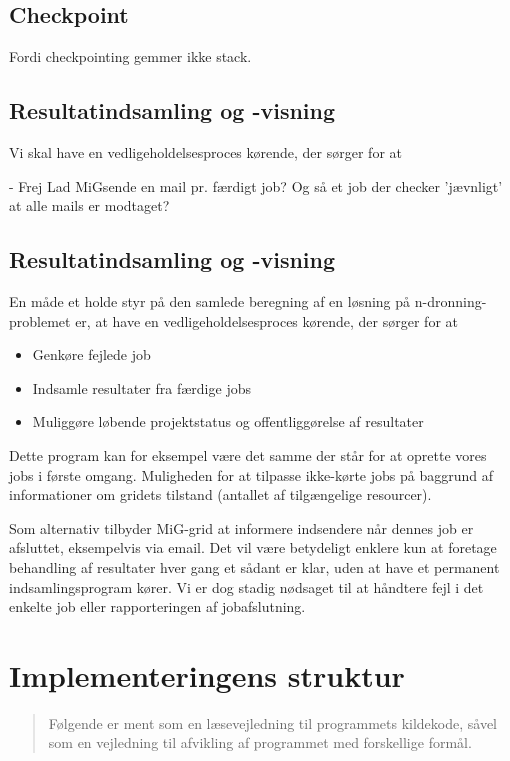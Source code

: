 \documentclass[draft,a4paper,10pt]{article}
\newcommand{\mig}{MiG}
\begin{document}
\subsection{Checkpoint}

Fordi checkpointing gemmer ikke stack.


\subsection{Resultatindsamling og -visning}
Vi skal have en vedligeholdelsesproces kørende, der sørger for at 

- Frej Lad \mig sende en mail pr. færdigt job? Og så et job der checker 'jævnligt' at alle mails er modtaget?


\subsection{Resultatindsamling og -visning}
En måde et holde styr på den samlede beregning af en løsning på n-dronning-problemet er, at have en vedligeholdelsesproces kørende, der sørger for at 
\begin{itemize}
	\item Genkøre fejlede job
	\item Indsamle resultater fra færdige jobs
	\item Muliggøre løbende projektstatus og offentliggørelse af resultater 
\end{itemize}
Dette program kan for eksempel være det samme der står for at oprette vores jobs i første omgang. Muligheden for at tilpasse ikke-kørte jobs på baggrund af informationer om gridets tilstand (antallet af tilgængelige resourcer). 

Som alternativ tilbyder \mig-grid at informere indsendere når dennes job er afsluttet, eksempelvis via email. Det vil være betydeligt enklere kun at foretage behandling af resultater hver gang et sådant er klar, uden at have et permanent indsamlingsprogram kører. Vi er dog stadig nødsaget til at håndtere fejl i det enkelte job eller rapporteringen af jobafslutning. 



\section{Implementeringens struktur}\label{implementeringensstruktur}
\begin{verse}
	Følgende er ment som en læsevejledning til programmets kildekode, såvel som en vejledning til afvikling af programmet med forskellige formål. 
\end{verse}
\end{document}
